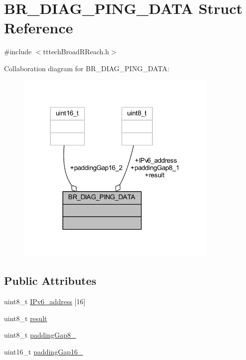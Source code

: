 \hypertarget{struct_b_r___d_i_a_g___p_i_n_g___d_a_t_a}{}\section{B\+R\+\_\+\+D\+I\+A\+G\+\_\+\+P\+I\+N\+G\+\_\+\+D\+A\+TA Struct Reference}
\label{struct_b_r___d_i_a_g___p_i_n_g___d_a_t_a}


{\ttfamily \#include $<$tttech\+Broad\+R\+Reach.\+h$>$}



Collaboration diagram for B\+R\+\_\+\+D\+I\+A\+G\+\_\+\+P\+I\+N\+G\+\_\+\+D\+A\+TA\+:\nopagebreak
\begin{figure}[H]
\begin{center}
\leavevmode
\includegraphics[width=275pt]{struct_b_r___d_i_a_g___p_i_n_g___d_a_t_a__coll__graph}
\end{center}
\end{figure}
\subsection*{Public Attributes}
\begin{DoxyCompactItemize}
\item 
uint8\+\_\+t \mbox{\hyperlink{struct_b_r___d_i_a_g___p_i_n_g___d_a_t_a_ab2996a088cc43e9ab39b5d108d95682f}{I\+Pv6\+\_\+address}} \mbox{[}16\mbox{]}
\item 
uint8\+\_\+t \mbox{\hyperlink{struct_b_r___d_i_a_g___p_i_n_g___d_a_t_a_ac31c42bf1a1783d9c6aa3de70a0b29cf}{result}}
\item 
uint8\+\_\+t \mbox{\hyperlink{struct_b_r___d_i_a_g___p_i_n_g___d_a_t_a_a232a176e3dad7eaba4dfc978610042e8}{padding\+Gap8\+\_}}
\item 
uint16\+\_\+t \mbox{\hyperlink{struct_b_r___d_i_a_g___p_i_n_g___d_a_t_a_a1c4c77e6f2aabcaec588628a55a25bed}{padding\+Gap16\+\_}}
\end{DoxyCompactItemize}


